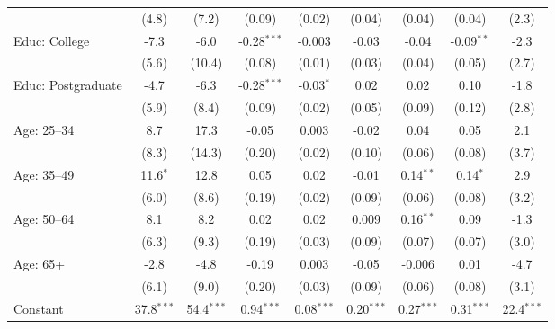 \begin{adjustbox}{width = \textwidth, center}
\begin{tabular}{lcccccccc}
                              & (4.8)         & (7.2)         & (0.09)        & (0.02)       & (0.04)       & (0.04)        & (0.04)       & (2.3)\\   
      Educ: College           & -7.3          & -6.0          & -0.28$^{***}$ & -0.003       & -0.03        & -0.04         & -0.09$^{**}$ & -2.3\\   
                              & (5.6)         & (10.4)        & (0.08)        & (0.01)       & (0.03)       & (0.04)        & (0.05)       & (2.7)\\   
      Educ: Postgraduate      & -4.7          & -6.3          & -0.28$^{***}$ & -0.03$^{*}$  & 0.02         & 0.02          & 0.10         & -1.8\\   
                              & (5.9)         & (8.4)         & (0.09)        & (0.02)       & (0.05)       & (0.09)        & (0.12)       & (2.8)\\   
      Age: 25--34             & 8.7           & 17.3          & -0.05         & 0.003        & -0.02        & 0.04          & 0.05         & 2.1\\   
                              & (8.3)         & (14.3)        & (0.20)        & (0.02)       & (0.10)       & (0.06)        & (0.08)       & (3.7)\\   
      Age: 35--49             & 11.6$^{*}$    & 12.8          & 0.05          & 0.02         & -0.01        & 0.14$^{**}$   & 0.14$^{*}$   & 2.9\\   
                              & (6.0)         & (8.6)         & (0.19)        & (0.02)       & (0.09)       & (0.06)        & (0.08)       & (3.2)\\   
      Age: 50--64             & 8.1           & 8.2           & 0.02          & 0.02         & 0.009        & 0.16$^{**}$   & 0.09         & -1.3\\   
                              & (6.3)         & (9.3)         & (0.19)        & (0.03)       & (0.09)       & (0.07)        & (0.07)       & (3.0)\\   
      Age: 65+                & -2.8          & -4.8          & -0.19         & 0.003        & -0.05        & -0.006        & 0.01         & -4.7\\   
                              & (6.1)         & (9.0)         & (0.20)        & (0.03)       & (0.09)       & (0.06)        & (0.08)       & (3.1)\\   
      Constant                & 37.8$^{***}$  & 54.4$^{***}$  & 0.94$^{***}$  & 0.08$^{***}$ & 0.20$^{***}$ & 0.27$^{***}$  & 0.31$^{***}$ & 22.4$^{***}$\\   

\end{tabular}
\end{adjustbox}
